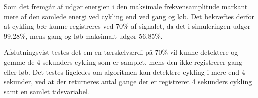 Som det fremgår af  udgør energien i den maksimale frekvensamplitude markant mere af den samlede energi ved cykling end ved gang og løb. Det bekræftes derfor at cykling bør kunne registreres ved 70\% af signalet, da det i simuleringen udgør 99,28\%, mens gang og løb maksimalt udgør 56,85\%. 

Afslutningsvist testes det om en tærskelværdi på 70\% vil kunne detektere og gemme de 4 sekunders cykling som er samplet, mens den ikke registrerer gang eller løb. Det testes ligeledes om algoritmen kan detektere cykling i mere end 4 sekunder, ved at der returneres antal gange der er registreret 4 sekunders cykling samt en samlet tidsvariabel. 

